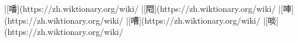 |[噃](https://zh.wiktionary.org/wiki/%
|[𨳍](https://zh.wiktionary.org/wiki/%
|[唓](https://zh.wiktionary.org/wiki/%
|[嘈](https://zh.wiktionary.org/wiki/%
|[啖](https://zh.wiktionary.org/wiki/%
